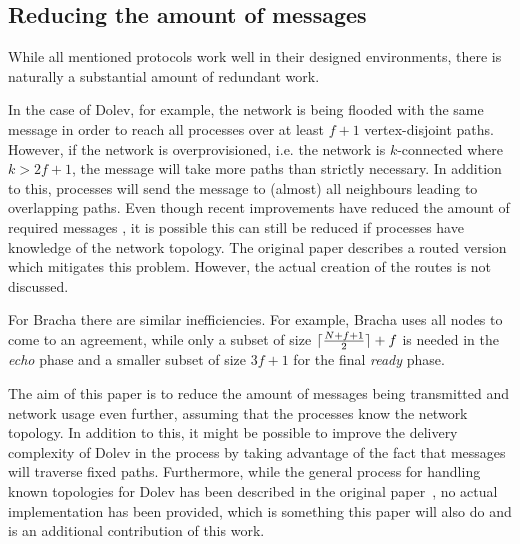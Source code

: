 \subsection*{Reducing the amount of messages}

While all mentioned protocols work well in their designed environments, there is naturally a substantial amount of redundant work.

In the case of Dolev, for example, the network is being flooded with the same message in order to reach all processes over at least $f+1$ vertex-disjoint paths. However, if the network is overprovisioned, i.e. the network is $k$-connected where $k > 2f+1$, the message will take more paths than strictly necessary. In addition to this, processes will send the message to (almost) all neighbours leading to overlapping paths. Even though recent improvements have reduced the amount of required messages 
, it is possible this can still be reduced if processes have knowledge of the network topology. The original paper describes a routed version which mitigates this problem. However, the actual creation of the routes is not discussed.

For Bracha there are similar inefficiencies. For example, Bracha uses all nodes to come to an agreement, while only a subset of size $\lceil\frac{N+f+1}{2}\rceil + f$ is needed in the \textit{echo} phase and a smaller subset of size $3f+1$ for the final \textit{ready} phase.


The aim of this paper is to reduce the amount of messages being transmitted and network usage even further, assuming that the processes know the network topology. In addition to this, it might be possible to improve the delivery complexity of Dolev in the process by taking advantage of the fact that messages will traverse fixed paths. Furthermore, while the general process for handling known topologies for Dolev has been described in the original paper~\cite{dolev}, no actual implementation has been provided, which is something this paper will also do and is an additional contribution of this work.
